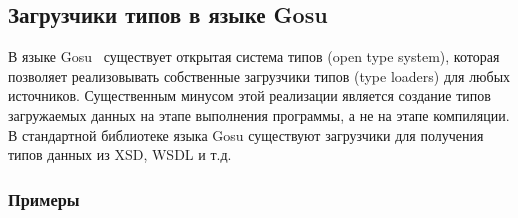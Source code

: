 \subsection{Загрузчики типов в языке Gosu}\label{gosu-type-loaders}
В языке Gosu~\cite{gosuguide} существует открытая система типов (open type system), которая позволяет реализовывать собственные загрузчики типов (type loaders) для любых источников.
Существенным минусом этой реализации является создание типов загружаемых данных на этапе выполнения программы, а не на этапе компиляции.
В стандартной библиотеке языка Gosu существуют загрузчики для получения типов данных из XSD, WSDL и т.д.

\subsubsection{Примеры}


